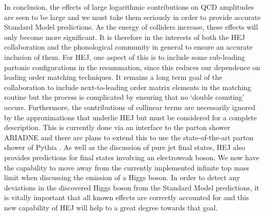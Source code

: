 In conclusion, the effects of large logarithmic contributions on QCD amplitudes are seen to be large and we must take them seriously in order to provide accurate Standard Model predictions. As the energy of colliders increase, these effects will only become more significant. It is therefore in the interests of both the HEJ collaboration and the phonological community in general to ensure an accurate inclusion of them. For HEJ, one aspect of this is to include some sub-leading partonic configurations in the resummation, since this reduces our dependence on leading order matching techniques. It remains a long term goal of the collaboration to include next-to-leading order matrix elements in the matching routine but the process is complicated by ensuring that no `double counting' occurs. Furthermore, the contributions of collinear terms are necessarily ignored by the approximations that underlie HEJ but must be considered for a complete description. This is currently done via an interface to the parton shower ARIADNE and there are plans to extend this to use the state-of-the-art parton shower of Pythia \cite{Sjostrand2007}. As well as the discussion of pure jet final states, HEJ also provides predictions for final states involving an electroweak boson. We now have the capability to move away from the currently implemented infinite top mass limit when discussing the emission of a Higgs boson. In order to detect any deviations in the discovered Higgs boson from the Standard Model predictions, it is vitally important that all known effects are correctly accounted for and this new capability of HEJ will help to a great degree towards that goal.